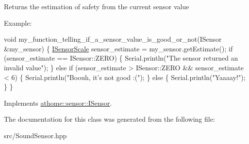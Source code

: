 Returns the estimation of safety from the current sensor value

Example\+:


\begin{DoxyCode}
\textcolor{keywordtype}{void} my\_function\_telling\_if\_a\_sensor\_value\_is\_good\_or\_not(ISensor &my\_sensor) \{
  \mbox{\hyperlink{classathome_1_1sensor_1_1_i_sensor_aa70bc27a4c17c86caf96cca776541ddf}{ISensorScale}} sensor\_estimate = my\_sensor.getEstimate();
  \textcolor{keywordflow}{if} (sensor\_estimate == ISensor::ZERO) \{
    Serial.println(\textcolor{stringliteral}{"The sensor returned an invalid value"});
  \}
  \textcolor{keywordflow}{else} \textcolor{keywordflow}{if} (sensor\_estimate > ISensor::ZERO && sensor\_estimate < 6) \{
    Serial.println(\textcolor{stringliteral}{"Boouh, it's not good :("});
  \}
  \textcolor{keywordflow}{else} \{
    Serial.println(\textcolor{stringliteral}{"Yaaaay!"});
  \}
\}
\end{DoxyCode}
 

Implements \mbox{\hyperlink{classathome_1_1sensor_1_1_i_sensor_af86df8538fecfcfc670b4adfbbde6abb}{athome\+::sensor\+::\+I\+Sensor}}.



The documentation for this class was generated from the following file\+:\begin{DoxyCompactItemize}
\item 
src/Sound\+Sensor.\+hpp\end{DoxyCompactItemize}
